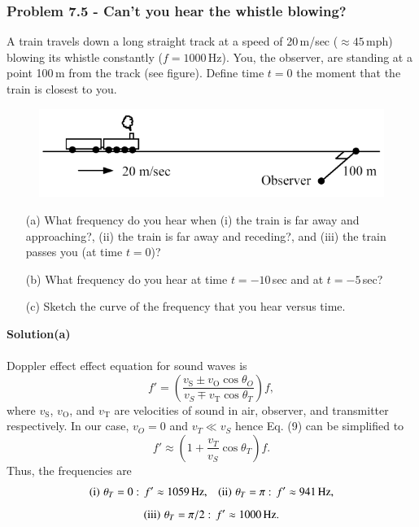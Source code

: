 \documentclass[12pt,a4paper]{article}
\begin{document}
\subsubsection*{Problem 7.5 - Can’t you hear the whistle blowing?}
A train travels down a long straight track at a speed of 20\,m/sec ($\approx45$\,mph) blowing its whistle constantly ($f=1000$\,Hz). You, the observer, are standing at a point 100\,m from the track (see figure). Define time $t=0$ the moment that the train is closest to you.
\begin{figure}[h]
    \centering
    \includegraphics[width=0.9\linewidth]{figs/fig_prob_7.5.png}
\end{figure}
\begin{enumerate}
    \item[(a)]What frequency do you hear when (i) the train is far away and approaching?, (ii) the train is far away and receding?, and (iii) the train passes you (at time $t=0$)?
    \item[(b)]What frequency do you hear at time $t=-10$\,sec and at $t=-5$\,sec?
    \item[(c)]Sketch the curve of the frequency that you hear versus time.
\end{enumerate}
\textbf{Solution(a)}
\\
\\Doppler effect effect equation for sound waves is
\begin{equation}
    f'=\left(\frac{v_{\text{S}}\pm v_{\text{O}}\cos\theta_O}{v_{S}\mp v_{\text{T}}\cos\theta_T}\right)f,
\end{equation}
where $v_{\text{S}}$, $v_{\text{O}}$, and $v_{\text{T}}$ are velocities of sound in air, observer, and transmitter respectively. In our case, $v_O=0$ and $v_T\ll v_S$ hence Eq. (9) can be simplified to 
\begin{equation}
    f'\approx\left(1+\frac{v_T}{v_S}\cos\theta_T\right)f.
\end{equation}
Thus, the frequencies are 
\[\text{(i)\,\,}\theta_T=0:\,f'\approx1059\,\text{Hz},\,\,\,\,\,\text{(ii)\,\,}\theta_T=\pi:\,f'\approx941\,\text{Hz},\]
\[\text{(iii)\,\,}\theta_T=\pi/2:\,f'\approx1000\,\text{Hz}.\]
\end{document}

